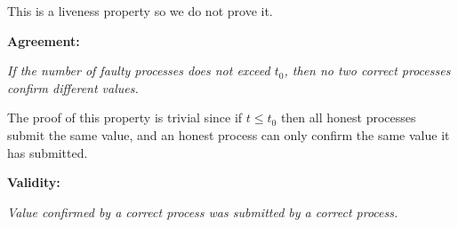 \documentclass{article}
\begin{document}
\noindent This is a liveness property so we do not prove it.

\vspace{2mm}

\noindent \textbf{Agreement:}
\vspace{2mm}

\noindent \textit{If the number of faulty processes does not exceed $t_0$, then no two correct processes confirm different values.}
\vspace{2mm}



\noindent The proof of this property is trivial since if $t \leq t_0$ then all honest processes submit the same value, and an honest process can only confirm the same value it has submitted.
\vspace{2mm}

\noindent \textbf{Validity:}
\vspace{2mm}

\noindent \textit{Value confirmed by a correct process was submitted by a correct process.}
\vspace{2mm}

\end{document}

